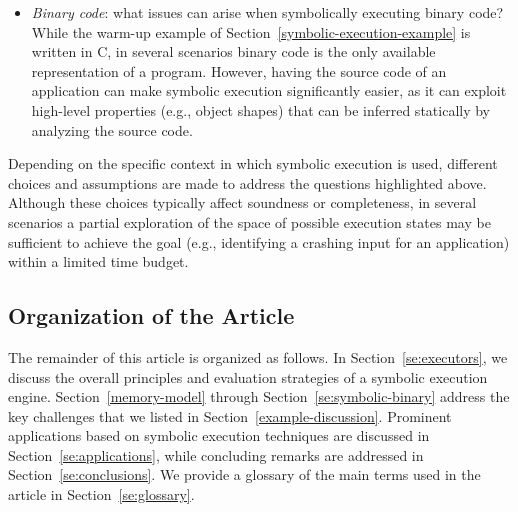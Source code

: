 \begin{itemize}
  \item {\em Binary code}: what issues can arise when symbolically executing binary code?
 While the warm-up example of Section~\ref{symbolic-execution-example} is written in C, in several scenarios binary code is the only available representation of a program. However, having the source code of an application can make symbolic execution significantly easier, as it can exploit high-level properties (e.g., object shapes) that can be inferred statically by analyzing the source code.
   
\end{itemize}
Depending on the specific context in which symbolic execution is used, different choices and assumptions are made to address the questions highlighted above. Although these choices typically affect soundness or completeness, in several scenarios a partial exploration of the space of possible execution states may be sufficient to achieve the goal (e.g., identifying a crashing input for an application) within a limited time budget.


\subsection{Organization of the Article}

The remainder of this article is organized as follows. In Section~\ref{se:executors}, we discuss the overall principles and evaluation strategies of a symbolic execution engine. Section~\ref{memory-model} through Section~\ref{se:symbolic-binary} address the key challenges that we listed in Section~\ref{example-discussion}. Prominent applications based on symbolic execution techniques are discussed in Section~\ref{se:applications}, while concluding remarks are addressed in Section~\ref{se:conclusions}. We provide a glossary of the main terms used in the article in Section~\ref{se:glossary}.

